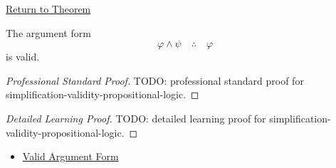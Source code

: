 \newpage
{}
\label{prf:simplification-validity-propositional-logic}

\begin{remark*}[Return]
\hyperref[thm:simplification-validity-propositional-logic]{Return to Theorem}
\end{remark*}

\begin{theorem*}
The argument form
\[
\varphi\land\psi \quad\therefore\quad \varphi
\]
is valid.
\end{theorem*}

\begin{proof}[Professional Standard Proof]
\LRAProofBodyStart
TODO: professional standard proof for simplification-validity-propositional-logic.
\end{proof}

\begin{proof}[Detailed Learning Proof]
\LRAProofBodyStart
TODO: detailed learning proof for simplification-validity-propositional-logic.
\end{proof}

\begin{remark*}
\end{remark*}

\begin{dependencies}
\begin{itemize}
  \item \hyperref[def:valid-argument-form-propositional-logic]{Valid Argument Form}
\end{itemize}
\end{dependencies}

\clearpage
